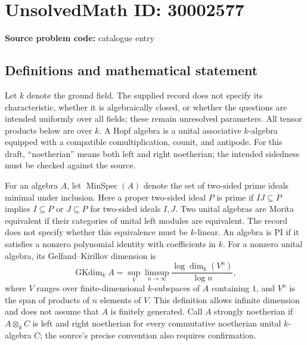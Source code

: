 \documentclass[11pt]{article}
\begin{document}
\section*{UnsolvedMath ID: 30002577}
\textbf{Source problem code:} catalogue entry
\subsection{Definitions and mathematical statement}
Let \(k\) denote the ground field. The supplied record does not specify its characteristic, whether it is algebraically closed, or whether the questions are intended uniformly over all fields; these remain unresolved parameters. All tensor products below are over \(k\). A Hopf algebra is a unital associative \(k\)-algebra equipped with a compatible comultiplication, counit, and antipode. For this draft, ``noetherian'' means both left and right noetherian; the intended sidedness must be checked against the source.

For an algebra \(A\), let \(\operatorname{MinSpec}(A)\) denote the set of two-sided prime ideals minimal under inclusion. Here a proper two-sided ideal \(P\) is prime if \(IJ\subseteq P\) implies \(I\subseteq P\) or \(J\subseteq P\) for two-sided ideals \(I,J\). Two unital algebras are Morita equivalent if their categories of unital left modules are equivalent. The record does not specify whether this equivalence must be \(k\)-linear. An algebra is PI if it satisfies a nonzero polynomial identity with coefficients in \(k\). For a nonzero unital algebra, its Gelfand--Kirillov dimension is
\[
\operatorname{GKdim}_k A
=\sup_V\limsup_{n\to\infty}
\frac{\log\dim_k(V^n)}{\log n},
\]
where \(V\) ranges over finite-dimensional \(k\)-subspaces of \(A\) containing \(1\), and \(V^n\) is the span of products of \(n\) elements of \(V\). This definition allows infinite dimension and does not assume that \(A\) is finitely generated. Call \(A\) strongly noetherian if \(A\otimes_k C\) is left and right noetherian for every commutative noetherian unital \(k\)-algebra \(C\); the source's precise convention also requires confirmation.
\end{document}
